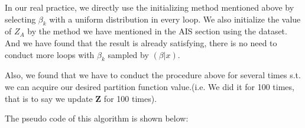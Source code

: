 In our real practice, we directly use the initializing method mentioned above by selecting $\beta_{k}$ with a uniform distribution in every loop. We also initialize the value of $Z_{A}$ by the method we have mentioned in the AIS section using the dataset. And we have found that the result is already satisfying, there is no need to conduct more loops with $\beta_{k}$ sampled by $(\beta|x)$.

Also, we found that we have to conduct the procedure above for several times s.t. we can acquire our desired partition function value.(i.e. We did it for 100 times, that is to say we update $\mathbf Z$ for 100 times).

The pseudo code of this algorithm is shown below:


